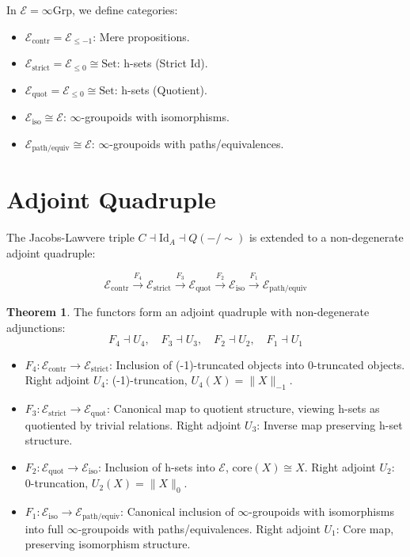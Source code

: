 \documentclass{article}
\theoremstyle{definition}
\newtheorem{theorem}{Theorem}
\begin{document}
In $\mathcal{E} = \infty\text{Grp}$, we define categories:
\begin{itemize}
    \item $\mathcal{E}_{\text{contr}} = \mathcal{E}_{\leq -1}$: Mere propositions.
    \item $\mathcal{E}_{\text{strict}} = \mathcal{E}_{\leq 0} \cong \text{Set}$: h-sets (Strict Id).
    \item $\mathcal{E}_{\text{quot}} = \mathcal{E}_{\leq 0} \cong \text{Set}$: h-sets (Quotient).
    \item $\mathcal{E}_{\text{iso}} \cong \mathcal{E}$: $\infty$-groupoids with isomorphisms.
    \item $\mathcal{E}_{\text{path/equiv}} \cong \mathcal{E}$: $\infty$-groupoids with paths/equivalences.
\end{itemize}

\section{Adjoint Quadruple}
The Jacobs-Lawvere triple $C \dashv \text{Id}_A \dashv Q(-/\sim)$ is extended to a non-degenerate adjoint quadruple:

\[
\mathcal{E}_{\text{contr}} \xrightarrow{F_4} \mathcal{E}_{\text{strict}} \xrightarrow{F_3} \mathcal{E}_{\text{quot}} \xrightarrow{F_2} \mathcal{E}_{\text{iso}} \xrightarrow{F_1} \mathcal{E}_{\text{path/equiv}}
\]

\begin{theorem}
The functors form an adjoint quadruple with non-degenerate adjunctions:
\[
F_4 \dashv U_4, \quad F_3 \dashv U_3, \quad F_2 \dashv U_2, \quad F_1 \dashv U_1
\]
\end{theorem}

\begin{itemize}
    \item \textbf{$F_4: \mathcal{E}_{\text{contr}} \to \mathcal{E}_{\text{strict}}$}: Inclusion of (-1)-truncated objects into 0-truncated objects. Right adjoint $U_4$: (-1)-truncation, $U_4(X) = \|X\|_{-1}$.
    \item \textbf{$F_3: \mathcal{E}_{\text{strict}} \to \mathcal{E}_{\text{quot}}$}: Canonical map to quotient structure, viewing h-sets as quotiented by trivial relations. Right adjoint $U_3$: Inverse map preserving h-set structure.
    \item \textbf{$F_2: \mathcal{E}_{\text{quot}} \to \mathcal{E}_{\text{iso}}$}: Inclusion of h-sets into $\mathcal{E}$, $\text{core}(X) \cong X$. Right adjoint $U_2$: 0-truncation, $U_2(X) = \|X\|_0$.
    \item \textbf{$F_1: \mathcal{E}_{\text{iso}} \to \mathcal{E}_{\text{path/equiv}}$}: Canonical inclusion of $\infty$-groupoids with isomorphisms into full $\infty$-groupoids with paths/equivalences. Right adjoint $U_1$: Core map, preserving isomorphism structure.
\end{itemize}
\end{document}
